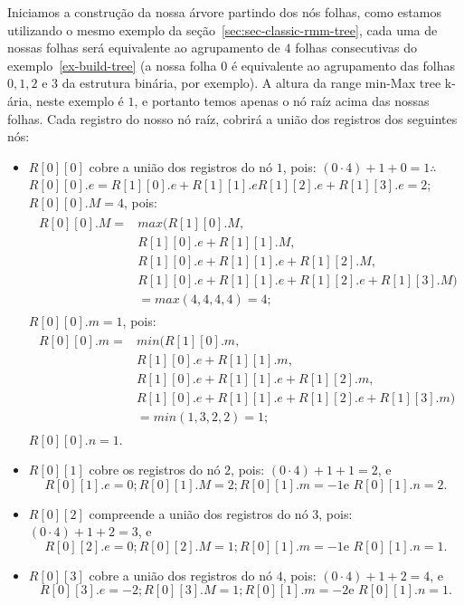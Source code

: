 \begin{example}
        Iniciamos a construção da nossa árvore partindo dos nós folhas, como estamos utilizando o mesmo exemplo da seção~\ref{sec:sec-classic-rmm-tree}, cada uma de nossas folhas será equivalente ao agrupamento de $4$ folhas consecutivas do exemplo~\ref{ex-build-tree} (a nossa folha $0$ é equivalente ao agrupamento das folhas $0,1,2 \mbox{ e } 3$ da estrutura binária, por exemplo). A altura da range min-Max tree k-ária, neste exemplo é $1$, e portanto temos apenas o nó raíz acima das nossas folhas. Cada registro do nosso nó raíz, cobrirá a união dos registros dos seguintes nós:
        \begin{itemize}
            \item $R[0][0]$ cobre a união dos registros do nó $1$, pois: $(0 \cdot 4) +1 + 0=1 \therefore$ \\
            $R[0][0].e = R[1][0].e + R[1][1].e R[1][2].e + R[1][3].e = 2$;\\
            $R[0][0].M = 4$, pois:\\
            \begin{eqnarray*}
                \begin{split}
                    R[0][0].M =& max(R[1][0].M, \\
                    &   R[1][0].e + R[1][1].M, \\
                    &   R[1][0].e + R[1][1].e + R[1][2].M,  \\
                    &   R[1][0].e + R[1][1].e + R[1][2].e + R[1][3].M)\\
                    &   = max(4,4,4,4) = 4;
                \end{split}
            \end{eqnarray*}
            $R[0][0].m = 1$, pois:
                \begin{eqnarray*}
                    \begin{split}
                        R[0][0].m =& min(R[1][0].m, \\
                        &   R[1][0].e + R[1][1].m, \\
                        &   R[1][0].e + R[1][1].e + R[1][2].m,  \\
                        &   R[1][0].e + R[1][1].e + R[1][2].e + R[1][3].m)\\
                        &   = min(1,3,2,2) = 1;
                    \end{split}
                \end{eqnarray*}
                $R[0][0].n = 1$.
            \item $R[0][1]$ cobre os registros do nó $2$, pois: $(0 \cdot 4) +1 + 1=2$, e
            $$R[0][1].e = 0; R[0][1].M = 2; R[0][1].m=-1 \mbox{e } R[0][1].n=2.$$
            \item $R[0][2]$ compreende a união dos registros do nó $3$, pois: $(0 \cdot 4) +1 + 2=3$, e
            $$R[0][2].e = 0; R[0][2].M = 1; R[0][1].m=-1 \mbox{e } R[0][1].n=1.$$
            \item $R[0][3]$ cobre a união dos registros do nó $4$, pois: $(0 \cdot 4) +1 + 2=4$, e
            $$R[0][3].e = -2; R[0][3].M = 1; R[0][1].m=-2 \mbox{e } R[0][1].n=1.$$
        \end{itemize} 


\end{example}
